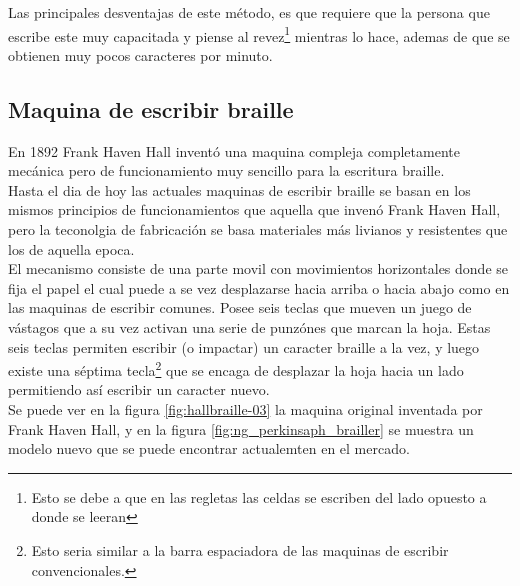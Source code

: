 Las principales desventajas de este m\'etodo, es que requiere que la persona
que escribe este muy capacitada y piense al revez\footnote{Esto se debe a que
en las regletas las celdas se escriben del lado opuesto a donde se leeran}
mientras lo hace, ademas de que se obtienen muy pocos caracteres por minuto.

\subsection{Maquina de escribir braille}
%
En 1892 Frank Haven Hall
invent\'o una maquina
compleja completamente mec\'anica pero de funcionamiento muy sencillo para la
escritura braille.\\

Hasta el dia de hoy las actuales maquinas de escribir braille se basan en los
mismos principios de funcionamientos que aquella que inven\'o Frank Haven Hall,
pero la teconolgia de fabricaci\'on se basa materiales m\'as livianos y
resistentes que los de aquella epoca. \\

El mecanismo consiste de una parte movil con movimientos horizontales donde se
fija el papel el cual puede a se vez desplazarse hacia arriba o hacia abajo
como en las maquinas de escribir comunes. Posee seis teclas que mueven un
juego de v\'astagos que a su vez activan una serie de punz\'ones que marcan la
hoja. Estas seis teclas permiten escribir (o impactar) un caracter braille a
la vez, y luego existe una s\'eptima tecla\footnote{Esto seria similar a la
barra espaciadora de las maquinas de escribir convencionales.} que se encaga de
desplazar la hoja hacia un lado permitiendo as\'i escribir un caracter nuevo.\\

Se puede ver en la figura \ref{fig:hallbraille-03} la maquina original
inventada por Frank Haven Hall, y en la figura
\ref{fig:ng_perkinsaph_brailler} se muestra un modelo nuevo que se puede
encontrar actualemten en el mercado.

